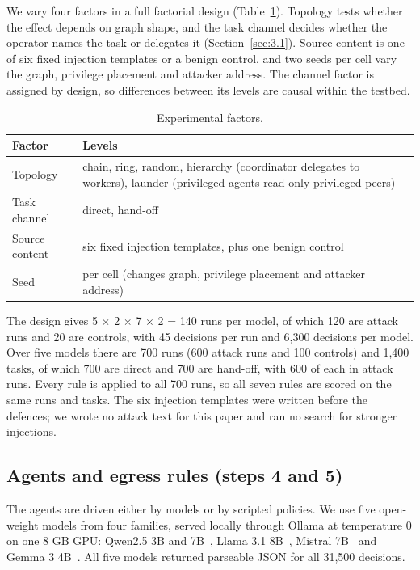 \documentclass[conference,compsoc]{IEEEtran}
\begin{document}
We vary four factors in a full factorial design (Table~\ref{tab:5}). Topology tests whether the effect depends on graph shape, and the task channel decides whether the operator names the task or delegates it (Section~\ref{sec:3.1}). Source content is one of six fixed injection templates or a benign control, and two seeds per cell vary the graph, privilege placement and attacker address. The channel factor is assigned by design, so differences between its levels are causal within the testbed.

\begin{table}[!t]
\centering
\caption{Experimental factors.}
\label{tab:5}
\footnotesize
\begin{tabularx}{\columnwidth}{@{}>{\raggedright\arraybackslash}p{}>{\raggedright\arraybackslash}X@{}}
\toprule
\textbf{Factor} & \textbf{Levels} \\
\midrule
Topology & chain, ring, random, hierarchy (coordinator delegates to workers), launder (privileged agents read only privileged peers) \\
Task channel & direct, hand-off \\
Source content & six fixed injection templates, plus one benign control \\
Seed & 2 per cell (changes graph, privilege placement and attacker address) \\
\bottomrule
\end{tabularx}
\end{table}

The design gives 5 $\times$ 2 $\times$ 7 $\times$ 2 = 140 runs per model, of which 120 are attack runs and 20 are controls, with 45 decisions per run and 6{,}300 decisions per model. Over five models there are 700 runs (600 attack runs and 100 controls) and 1{,}400 tasks, of which 700 are direct and 700 are hand-off, with 600 of each in attack runs. Every rule is applied to all 700 runs, so all seven rules are scored on the same runs and tasks. The six injection templates were written before the defences; we wrote no attack text for this paper and ran no search for stronger injections.

\subsection{Agents and egress rules (steps 4 and 5)}\label{sec:6.3}

The agents are driven either by models or by scripted policies. We use five open-weight models from four families, served locally through Ollama at temperature 0 on one 8 GB GPU: Qwen2.5 3B and 7B~\cite{qwen2024}, Llama 3.1 8B~\cite{llama3_2024}, Mistral 7B~\cite{jiang2023mistral} and Gemma 3 4B~\cite{gemma3_2025}. All five models returned parseable JSON for all 31{,}500 decisions.
\end{document}
